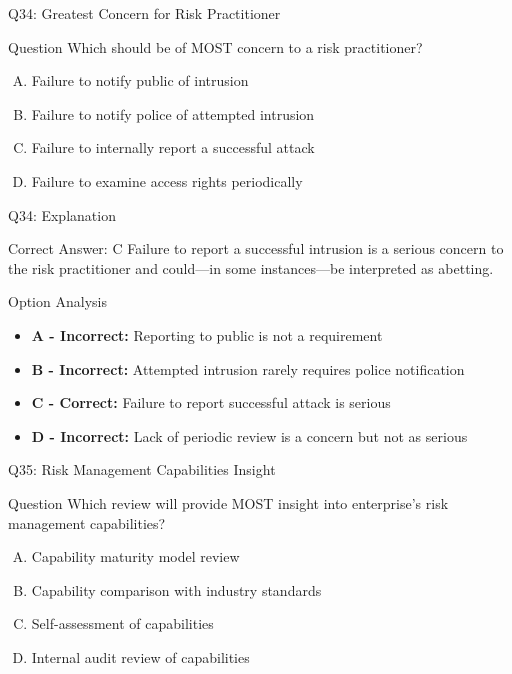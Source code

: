 \documentclass{beamer}
\begin{document}
	\begin{frame}{Q34: Greatest Concern for Risk Practitioner}
		\begin{block}{Question}
			Which should be of MOST concern to a risk practitioner?
		\end{block}
		\begin{enumerate}[(A)]
			\item Failure to notify public of intrusion
			\item Failure to notify police of attempted intrusion
			\item Failure to internally report a successful attack
			\item Failure to examine access rights periodically
		\end{enumerate}
	\end{frame}
	
	\begin{frame}{Q34: Explanation}
		\begin{block}{Correct Answer: C}
			Failure to report a successful intrusion is a serious concern to the risk practitioner and could—in some instances—be interpreted as abetting.
		\end{block}
		\begin{block}{Option Analysis}
			\begin{itemize}
				\item \textbf{A - Incorrect:} Reporting to public is not a requirement
				\item \textbf{B - Incorrect:} Attempted intrusion rarely requires police notification
				\item \textbf{C - Correct:} Failure to report successful attack is serious
				\item \textbf{D - Incorrect:} Lack of periodic review is a concern but not as serious
			\end{itemize}
		\end{block}
	\end{frame}
	
	\begin{frame}{Q35: Risk Management Capabilities Insight}
		\begin{block}{Question}
			Which review will provide MOST insight into enterprise's risk management capabilities?
		\end{block}
		\begin{enumerate}[(A)]
			\item Capability maturity model review
			\item Capability comparison with industry standards
			\item Self-assessment of capabilities
			\item Internal audit review of capabilities
		\end{enumerate}
	\end{frame}
	
\end{document}
